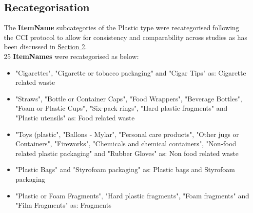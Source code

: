 \documentclass[10pt]{article}\usepackage[]{graphicx}\usepackage[]{color}
\begin{document}
\pagebreak
\subsection{Recategorisation}\label{recategorisation}

The \textbf{ItemName} subcategories of the Plastic type were recategorised following the CCI protocol to allow for consistency and comparability across studies as has been discussed in \hyperref[research]{Section 2}.\\

25 \textbf{ItemNames} were recategorised as below:
\begin{itemize}
\item "Cigarettes", "Cigarette or tobacco packaging" and "Cigar Tips" as: Cigarette related waste
\item "Straws", "Bottle or Container Caps", "Food Wrappers", "Beverage Bottles", "Foam or Plastic Cups", "Six-pack rings", "Hard plastic fragments" and "Plastic utensils" as: Food related waste
\item "Toys (plastic", "Ballons - Mylar", "Personal care products", "Other jugs or Containers", "Fireworks", "Chemicals and chemical containers", "Non-food related plastic packaging" and "Rubber Gloves" as: Non food related waste
\item "Plastic Bags" and "Styrofoam packaging" as: Plastic bags and Styrofoam packaging
\item "Plastic or Foam Fragments", "Hard plastic fragments", "Foam fragments" and "Film Fragments" as: Fragments
\end{itemize}
\end{document}
